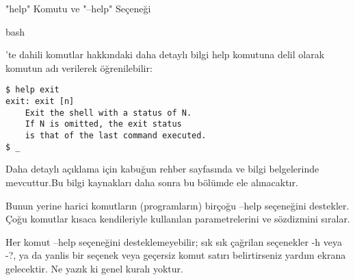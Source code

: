 \begin{section}{"help" Komutu ve "--help" Seçeneği}

\begin{em}bash\end{em}'te dahili komutlar hakkındaki daha detaylı bilgi help komutuna delil olarak komutun adı verilerek öğrenilebilir:
\begin{verbatim}
$ help exit
exit: exit [n]
    Exit the shell with a status of N.
    If N is omitted, the exit status
    is that of the last command executed.
$ _
\end{verbatim}

Daha detaylı açıklama için kabuğun rehber sayfasında ve bilgi belgelerinde mevcuttur.Bu bilgi kaynakları daha sonra bu bölümde ele alınacaktır.

Bunun yerine harici komutların (programların) birçoğu --help seçeneğini destekler. Çoğu komutlar kısaca kendileriyle kullanılan parametrelerini ve sözdizmini sıralar.

Her komut --help seçeneğini desteklemeyebilir; sık sık çağrilan seçenekler -h veya -?, ya da yanlis bir seçenek veya geçersiz komut satırı belirtirseniz yardım ekrana gelecektir. Ne yazık ki genel kuralı yoktur.
\end{section}
